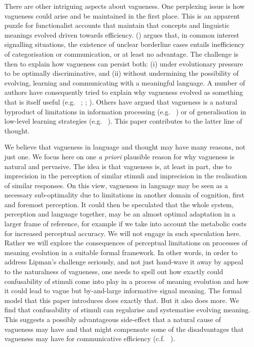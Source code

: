 \documentclass[11pt,english]{article}
\numberwithin{equation}{section}
\newcommand{\citetbjps}[1]{\citeauthor{#1} (\citeyear{#1})}
\newcommand{\citealtbjps}[1]{\citeauthor{#1} \citeyear{#1}}
\newcommand{\citepbjpspre}[2]{(#1~\citeauthor{#2} \citeyear{#2})}
\begin{document}
There are other intriguing aspects about vagueness. One perplexing issue is how vagueness
could arise and be maintained in the first place. This is an apparent puzzle for functionalist
accounts that maintain that concepts and linguistic meanings evolved driven towards
efficiency. \citetbjps{Lipman2009:Why-is-Language} argues that, in common interest signalling
situations, the existence of unclear borderline cases entails inefficiency of categorisation or
communication, or at least no advantage. The challenge is then to explain how vagueness
can persist both: (i) under evolutionary pressure to be optimally discriminative, and (ii)
without undermining the possibility of evolving, learning and communicating with a meaningful
language. A number of authors have consequently tried to explain why vagueness evolved as
something that is itself useful
(e.g.~\citealtbjps{Jaegherde-Jaegher2003:A-Game-Theoreti}; \citealtbjps{Deemter2009:Utility-and-Lan}; \citealtbjps{BlumeBoard2013:Intentional-Vag}).
Others have argued that vagueness is a natural byproduct of limitations in information
processing \citepbjpspre{e.g.}{FrankeJager2010:Vagueness-Signa} or of generalisation in low-level
learning strategies \citepbjpspre{e.g.}{OConnor2013:The-Evolution-o}. This paper contributes to the
latter line of thought.

We believe that vagueness in language and thought may have many reasons, not just one. We focus
here on one \emph{a priori} plausible reason for why vagueness is natural and pervasive. The
idea is that vagueness is, at least in part, due to imprecision in the perception of similar
stimuli and imprecision in the realisation of similar responses. On this view, vagueness in
language may be seen as a necessary sub-optimality due to limitations in another domain of
cognition, first and foremost perception. It could then be speculated that the whole system,
perception and language together, may be an almost optimal adaptation in a larger frame
of reference, for example if we take into account the metabolic costs for increased perceptual
accuracy. We will not engage in such speculation here. Rather we will explore the consequences
of perceptual limitations on processes of meaning evolution in a suitable formal framework. In
other words, in order to address Lipman's challenge seriously, and not just hand-wave it away
by appeal to the naturalness of vagueness, one needs to spell out how exactly could confusability
of stimuli come into play in a process of meaning evolution and how it could lead to
vague but by-and-large informative signal meaning. The formal model that this paper introduces
does exactly that. But it also does more. We find that confusability of stimuli can regularise
and systematise evolving meaning. This suggests a possibly advantageous side-effect that a
natural cause of vagueness may have and that might compensate some of the disadvantages that
vagueness may have for communicative efficiency \citepbjpspre{c.f.}{OConnor2013:The-Evolution-o}.
\end{document}
